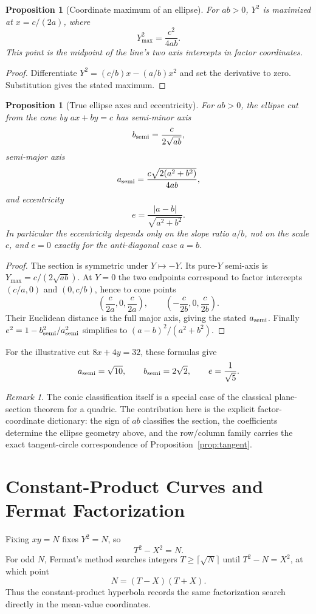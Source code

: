 \documentclass[11pt]{amsart}
\newtheorem{proposition}[theorem]{Proposition}
\theoremstyle{remark}
\newtheorem*{remark}{Remark}
\begin{document}
\begin{proposition}[Coordinate maximum of an ellipse]\label{prop:semiaxes}
For $ab>0$, $Y^2$ is maximized at $x=c/(2a)$, where
\[
Y_{\max}^2=\frac{c^2}{4ab}.
\]
This point is the midpoint of the line's two axis intercepts in factor coordinates.
\end{proposition}
\begin{proof}
Differentiate $Y^2=(c/b)x-(a/b)x^2$ and set the derivative to zero. Substitution gives the stated maximum.
\end{proof}

\begin{proposition}[True ellipse axes and eccentricity]\label{prop:trueaxes}
For $ab>0$, the ellipse cut from the cone by $ax+by=c$ has semi-minor axis
\[
b_{\rm semi}=\frac{c}{2\sqrt{ab}},
\]
semi-major axis
\[
a_{\rm semi}=\frac{c\sqrt{2(a^2+b^2)}}{4ab},
\]
and eccentricity
\[
e=\frac{|a-b|}{\sqrt{a^2+b^2}}.
\]
In particular the eccentricity depends only on the slope ratio $a/b$, not on the scale $c$, and $e=0$ exactly for the anti-diagonal case $a=b$.
\end{proposition}
\begin{proof}
The section is symmetric under $Y\mapsto-Y$. Its pure-$Y$ semi-axis is $Y_{\max}=c/(2\sqrt{ab})$. At $Y=0$ the two endpoints correspond to factor intercepts $(c/a,0)$ and $(0,c/b)$, hence to cone points
\[
\left(\frac{c}{2a},0,\frac{c}{2a}\right),\qquad
\left(-\frac{c}{2b},0,\frac{c}{2b}\right).
\]
Their Euclidean distance is the full major axis, giving the stated $a_{\rm semi}$. Finally $e^2=1-b_{\rm semi}^2/a_{\rm semi}^2$ simplifies to $(a-b)^2/(a^2+b^2)$.
\end{proof}

For the illustrative cut $8x+4y=32$, these formulas give
\[
a_{\rm semi}=\sqrt{10},\qquad b_{\rm semi}=2\sqrt2,\qquad e=\frac1{\sqrt5}.
\]

\begin{remark}
The conic classification itself is a special case of the classical plane-section theorem for a quadric. The contribution here is the explicit factor-coordinate dictionary: the sign of $ab$ classifies the section, the coefficients determine the ellipse geometry above, and the row/column family carries the exact tangent-circle correspondence of Proposition~\ref{prop:tangent}.
\end{remark}

\section{Constant-Product Curves and Fermat Factorization}
Fixing $xy=N$ fixes $Y^2=N$, so
\begin{equation}
T^2-X^2=N. \tag{4.1}
\end{equation}
For odd $N$, Fermat's method searches integers $T\ge\lceil\sqrt N\rceil$ until $T^2-N=X^2$, at which point
\[
N=(T-X)(T+X).
\]
Thus the constant-product hyperbola records the same factorization search directly in the mean-value coordinates.
\end{document}
